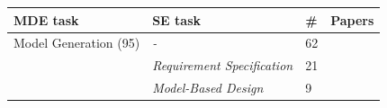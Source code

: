 \begin{tabular} {p{}  p{} p{} p{}} \\ 
\toprule 
MDE task & SE task & \# & Papers\\ 
\midrule  
Model Generation (95) & \emph{-} & 62 & \cite{ \paperninth,\papereleventh,\papersixteenth,\papertwentyseventh,\papertwentyeighth,\paperthirtyfourth,\paperthirtyseventh,\paperthirtyeighth,\paperfortysecond,\paperfiftyseventh,\paperfiftyninth,\papersixtyeighth,\papersixtyninth,\paperseventyfourth,\paperseventyseventh,\papereightyfirst,\papereightysixth,\paperninetyfirst,\paperninetyfifth,\paperninetyseventh,\paperonehundredseventh,\paperonehundredninth,\paperonehundredtenth,\paperonehundredfifteenth,\paperonehundrednineteenth,\paperonehundredtwentieth,\paperonehundredtwentyseventh,\paperonehundredtwentyeighth,\paperonehundredthirtieth,\paperonehundredthirtyfirst,\paperonehundredthirtyseventh,\paperonehundredthirtyeighth,\paperonehundredthirtyninth,\paperonehundredfiftieth,\paperonehundredfiftyfirst,\paperonehundredfiftyeighth,\paperonehundredsixtyfirst,\paperonehundredsixtysecond,\paperonehundredsixtyfifth,\paperonehundredseventieth,\paperonehundredeightyfourth,\paperonehundredninetieth,\paperonehundredninetyfirst,\paperonehundredninetysecond,\paperonehundredninetythird,\paperonehundredninetyfourth,\papertwohundredth,\papertwohundredseventh,\papertwohundredninth,\papertwohundredtenth,\papertwohundredfourteenth,\papertwohundredfifteenth,\papertwohundredsixteenth,\papertwohundredtwentythird,\papertwohundredtwentyninth,\papertwohundredthirtyfourth,\papertwohundredfortieth,\papertwohundredfortyfourth,\papertwohundredfortyseventh,\papertwohundredfiftyfirst,\papertwohundredfiftysecond,\papertwohundredfiftyfourth }\\ 
 & \emph{Requirement Specification} & 21 & \cite{ \paperseventeenth,\papereighteenth,\paperthirtyfifth,\paperfortyeighth,\paperfortyninth,\paperfiftieth,\paperfiftyfifth,\paperseventieth,\paperonehundredtwentysecond,\paperonehundredtwentyfifth,\paperonehundredthirtythird,\paperonehundredfiftythird,\paperonehundredsixtysixth,\paperonehundredseventyfirst,\paperonehundredseventysixth,\paperonehundredseventyeighth,\papertwohundredfourth,\papertwohundredfifth,\papertwohundredtwelfth,\papertwohundredseventeenth,\papertwohundredtwentyseventh }\\ 
 & \emph{Model-Based Design} & 9 & \cite{ \paperfourteenth,\paperfortysixth,\paperfiftieth,\paperfiftyfifth,\papereightythird,\paperonehundredsixtythird,\paperonehundredninetysixth,\papertwohundredfifth,\papertwohundredeighteenth }\\ 

\end{tabular}
